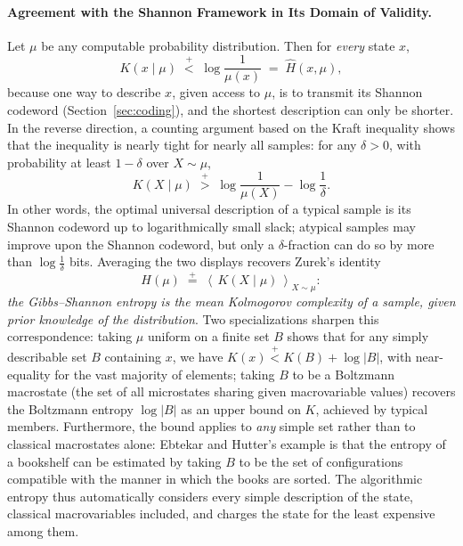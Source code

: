 \documentclass[11pt]{article}
\newcommand{\plt}{\mathrel{\stackrel{+}{<}}}
\newcommand{\pgt}{\mathrel{\stackrel{+}{>}}}
\newcommand{\peq}{\mathrel{\stackrel{+}{=}}}
\newcommand{\E}[1]{\left\langle #1 \right\rangle}
\begin{document}
\paragraph{Agreement with the Shannon Framework in Its Domain of Validity.} Let $\mu$ be any computable probability distribution. Then for \emph{every} state $x$,
\[
K(x \mid \mu) \;\plt\; \log \frac{1}{\mu(x)} \;=\; \hat H(x, \mu),
\]
because one way to describe $x$, given access to $\mu$, is to transmit its Shannon codeword (Section~\ref{sec:coding}), and the shortest description can only be shorter. In the reverse direction, a counting argument based on the Kraft inequality shows that the inequality is nearly tight for nearly all samples: for any $\delta > 0$, with probability at least $1 - \delta$ over $X \sim \mu$,
\[
K(X \mid \mu) \;\pgt\; \log\frac{1}{\mu(X)} - \log \frac1\delta .
\]
In other words, the optimal universal description of a typical sample is its Shannon codeword up to logarithmically small slack; atypical samples may improve upon the Shannon codeword, but only a $\delta$-fraction can do so by more than $\log\frac1\delta$ bits. Averaging the two displays recovers Zurek's identity
\[
H(\mu) \;\peq\; \E{\,K(X \mid \mu)\,}_{X \sim \mu} :
\]
\emph{the Gibbs--Shannon entropy is the mean Kolmogorov complexity of a sample, given prior knowledge of the distribution}. Two specializations sharpen this correspondence: taking $\mu$ uniform on a finite set $B$ shows that for any simply describable set $B$ containing $x$, we have $K(x) \plt K(B) + \log |B|$, with near-equality for the vast majority of elements; taking $B$ to be a Boltzmann macrostate (the set of all microstates sharing given macrovariable values) recovers the Boltzmann entropy $\log|B|$ as an upper bound on $K$, achieved by typical members. Furthermore, the bound applies to \emph{any} simple set rather than to classical macrostates alone: Ebtekar and Hutter's example is that the entropy of a bookshelf can be estimated by taking $B$ to be the set of configurations compatible with the manner in which the books are sorted. The algorithmic entropy thus automatically considers every simple description of the state, classical macrovariables included, and charges the state for the least expensive among them.
\end{document}
